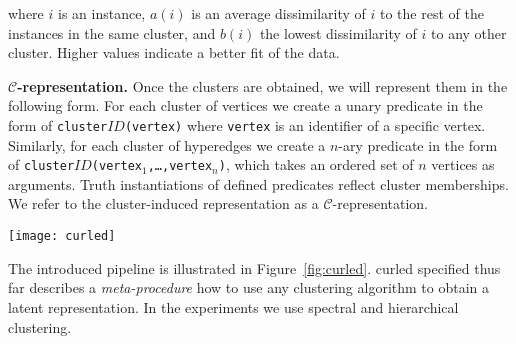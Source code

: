 where $i$ is an instance, $a(i)$ is an average dissimilarity of $i$ to the rest of the instances in the same cluster, and $b(i)$ the lowest dissimilarity of $i$ to any other cluster. 
Higher values indicate a better fit of the data.


\textbf{$\mathcal{C}$-representation.} 
Once the clusters are obtained, we will represent them in the following form.
For each cluster of vertices we create a unary predicate in the form of \texttt{cluster$ID$(vertex)} where {\tt vertex} is an identifier of a specific vertex.
Similarly, for each cluster of hyperedges we create a $n$-ary predicate in the form of \texttt{cluster$ID$(vertex$_1$,\ldots,vertex$_n$)}, which takes an ordered set of $n$ vertices as arguments.
Truth instantiations of defined predicates reflect cluster memberships.
We refer to the cluster-induced representation as a $\mathcal{C}$-representation.


\begin{sidewaysfigure}
  \centering
  \medskip
  \texttt{[image: curled]}
  \caption{An illustration of \gls{curled} procedure. The left-most figure represents a given hypergraph, where colour of a vertex indicates its feature value. The graph (i.e., vertices and edges) is then clustered according to different similarity interpretations. The upper clustering is based on vertex attributes: the vertices are clustered into \textit{red} and \textit{black} ones, while the edges are clustered according to the colour of the vertices they connect. The bottom clustering is based on the structure of the neighbourhoods. The vertices are clustered into a group that have only \textit{black} neighbours (\{{\tt1}\}), only \textit{red} neighbours (\{{\tt 6,7}\}), and neighbours of both colours (\{{\tt 2,3,4,5}\}). The edges are clustered into a group of edges connecting \textit{black} vertices with only \textit{black} neighbours and \textit{black} vertices with \textit{red} neighbours (\{{\tt1-2,1-3}\}), a group of edges connecting \textit{red} vertices with only \textit{red} neighbours to \textit{red} vertices with neighbours of both colour (\{{\tt6-7}\}), and so on. The final step transforms the obtained clusterings into a relational representation. The procedure can further be repeated to create more layers of features. }
  \label{fig:curled}
\end{sidewaysfigure}

 
The introduced pipeline is illustrated in Figure~\ref{fig:curled}.
\gls{curled} specified thus far describes a \textit{meta-procedure} how to use any clustering algorithm to obtain a latent representation.
In the experiments we use spectral and hierarchical clustering.



